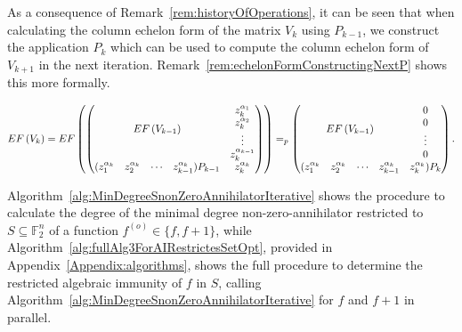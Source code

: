 \documentclass[11pt]{llncs}
\begin{document}
As a consequence of Remark~\ref{rem:historyOfOperations}, it can be seen that when calculating the column echelon form of the matrix $V_k$ using $P_{k-1}$, we construct the application $P_k$ which can be used to compute the column echelon form of $V_{k+1}$ in the next iteration. Remark~\ref{rem:echelonFormConstructingNextP} shows this more formally.

\begin{remark}\label{rem:echelonFormConstructingNextP}
    \begin{align*}
        EF\left(V_{k}\right) =
        EF
        \begin{pmatrix}
        \begin{pmatrix}
            \multicolumn{4}{c}{\multirow{4}{*}{$EF\left(V_{k-1}\right)$}} & z_k^{\alpha_1}\\
            & & & & z_k^{\alpha_2}\\
            & & & & \vdots\\
            & & & & z_{k}^{\alpha_{k-1}}\\
            (z_1^{\alpha_{k}} & z_2^{\alpha_{k}}& \cdots & z_{k-1}^{\alpha_{k}})P_{k-1} & z_{k}^{\alpha_k}
        \end{pmatrix}
        \end{pmatrix}
        =_p 
        \begin{pmatrix}
            \multicolumn{4}{c}{\multirow{4}{*}{$EF\left(V_{k-1}\right)$}} & 0\\
            & & & & 0\\
            & & & & \vdots\\
            & & & & 0\\
            (z_1^{\alpha_{k}} & z_2^{\alpha_{k}}& \cdots & z_{k-1}^{\alpha_{k}} & z_{k}^{\alpha_k})P_{k}
        \end{pmatrix}.
    \end{align*}
\end{remark}

Algorithm~\ref{alg:MinDegreeSnonZeroAnnihilatorIterative} shows the procedure to calculate the degree of the minimal degree non-zero-annihilator 
restricted to $S\subseteq \mathbb{F}_2^n$ of a function $f^{(o)} \in \{f, f+ 1\}$, while Algorithm~\ref{alg:fullAlg3ForAIRestrictesSetOpt}, provided in Appendix~\ref{Appendix:algorithms}, shows the full procedure to determine the restricted algebraic immunity of $f$ in $S$, calling Algorithm~\ref{alg:MinDegreeSnonZeroAnnihilatorIterative} for $f$ and $f+ 1$ in parallel.
\end{document}
